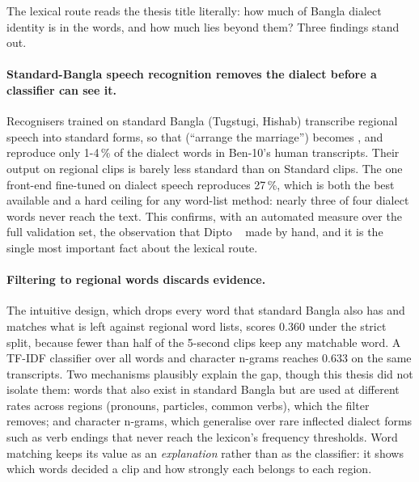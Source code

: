 The lexical route reads the thesis title literally: how much of Bangla dialect
identity is in the words, and how much lies beyond them? Three findings stand
out.

\paragraph{Standard-Bangla speech recognition removes the dialect before a
classifier can see it.} Recognisers trained on standard Bangla (Tugstugi,
Hishab) transcribe regional speech into standard forms, so that 
(``arrange the marriage'') becomes , and reproduce only
1-4\,\% of the dialect words in Ben-10's human transcripts. Their output on
regional clips is barely less standard than on Standard clips. The one front-end
fine-tuned on dialect speech reproduces 27\,\%, which is both the best available
and a hard ceiling for any word-list method: nearly three of four dialect words
never reach the text. This confirms, with an automated measure over the full
validation set, the observation that Dipto \etal~\cite{Dipto2025ASR} made by hand, and it
is the single most important fact about the lexical route.

\paragraph{Filtering to regional words discards evidence.} The intuitive
design, which drops every word that standard Bangla also has and matches what
is left against regional word lists, scores 0.360 under the strict split, because
fewer than half of the 5-second clips keep any matchable word. A TF-IDF
classifier over all words and character n-grams reaches 0.633 on the same
transcripts. Two mechanisms plausibly explain the gap, though this thesis did
not isolate them: words that also exist in standard Bangla but are used at
different rates across regions (pronouns, particles, common verbs), which the
filter removes; and character n-grams, which generalise over rare inflected
dialect forms such as verb endings that never reach the lexicon's frequency
thresholds. Word matching keeps its value as an \emph{explanation} rather than as the
classifier: it shows which words decided a clip and how strongly each belongs
to each region.

